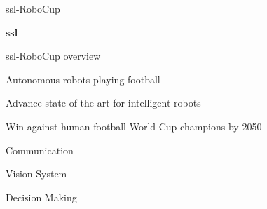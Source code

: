 
\begin{frame}{\acs{ssl}-RoboCup}

    \begin{center}
        \textbf{\ac{ssl}}
    \end{center}
    
    \begin{adjustbox}{scale=1,center,margin={0cm,0cm,0cm,0cm}}
            
    \end{adjustbox}
    
\end{frame}


\begin{frame}{\acs{ssl}-RoboCup overview}

    Autonomous robots playing football

    Advance state of the art for intelligent robots

    Win against human football World Cup champions by 2050

    Communication

    Vision System

    Decision Making
    
\end{frame}

